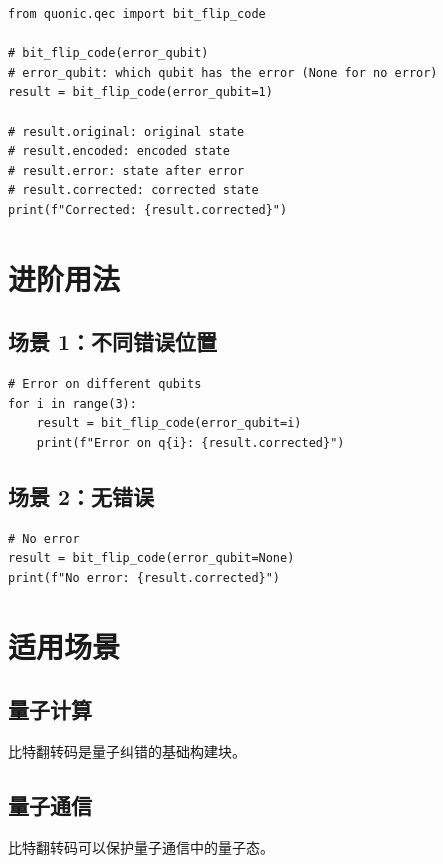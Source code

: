 \documentclass[12pt,a4paper]{article}
\begin{document}
\begin{lstlisting}[style=python]
from quonic.qec import bit_flip_code

# bit_flip_code(error_qubit)
# error_qubit: which qubit has the error (None for no error)
result = bit_flip_code(error_qubit=1)

# result.original: original state
# result.encoded: encoded state
# result.error: state after error
# result.corrected: corrected state
print(f"Corrected: {result.corrected}")
\end{lstlisting}

\section{进阶用法}

\subsection{场景 1：不同错误位置}

\begin{lstlisting}[style=python]
# Error on different qubits
for i in range(3):
    result = bit_flip_code(error_qubit=i)
    print(f"Error on q{i}: {result.corrected}")
\end{lstlisting}

\subsection{场景 2：无错误}

\begin{lstlisting}[style=python]
# No error
result = bit_flip_code(error_qubit=None)
print(f"No error: {result.corrected}")
\end{lstlisting}

\section{适用场景}

\subsection{量子计算}

比特翻转码是量子纠错的基础构建块。

\subsection{量子通信}

比特翻转码可以保护量子通信中的量子态。
\end{document}
